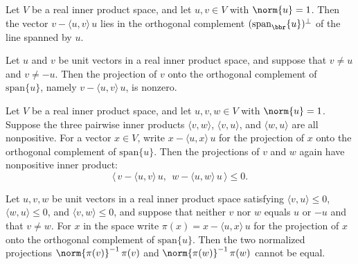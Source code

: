 \begin{lemma}
\label{CodingTheory.Johnson.orthProj_mem_orthogonal}
\leanok
{}
Let $V$ be a real inner product space, and let $u,v \in V$ with $\norm{u} = 1$. Then the
vector $v - \langle u,v\rangle\, u$ lies in the orthogonal complement
$(\mathrm{span}_{\bbr}\{u\})^{\perp}$ of the line spanned by $u$.
\end{lemma}

\begin{lemma}
\label{CodingTheory.Johnson.orthProj_ne_zero}
\leanok
{}
Let $u$ and $v$ be unit vectors in a real inner product space, and suppose that $v \neq
u$ and $v \neq -u$. Then the projection of $v$ onto the orthogonal complement of
$\mathrm{span}\{u\}$, namely $v - \langle u,v\rangle\, u$, is nonzero.
\end{lemma}

\begin{lemma}
\label{CodingTheory.Johnson.orthProj_inner_nonpos}
\leanok
{}
Let $V$ be a real inner product space, and let $u,v,w \in V$ with $\norm{u} = 1$.
Suppose the three pairwise inner products $\langle v,w\rangle$, $\langle v,u\rangle$,
and $\langle w,u\rangle$ are all nonpositive. For a vector $x \in V$, write $x - \langle
u,x\rangle\, u$ for the projection of $x$ onto the orthogonal complement of
$\mathrm{span}\{u\}$. Then the projections of $v$ and $w$ again have nonpositive inner
product:
\[
\bigl\langle\, v - \langle u,v\rangle\, u,\ \ w - \langle u,w\rangle\, u \,\bigr\rangle
\le 0.
\]
\end{lemma}

\begin{lemma}
\label{CodingTheory.Johnson.normalized_orthProj_injective}
\leanok
{}
Let $u,v,w$ be unit vectors in a real inner product space satisfying $\langle v,u\rangle
\le 0$, $\langle w,u\rangle \le 0$, and $\langle v,w\rangle \le 0$, and suppose that
neither $v$ nor $w$ equals $u$ or $-u$ and that $v \neq w$. For $x$ in the space write
$\pi(x) = x - \langle u,x\rangle\,u$ for the projection of $x$ onto the orthogonal
complement of $\mathrm{span}\{u\}$. Then the two normalized projections
$\norm{\pi(v)}^{-1}\,\pi(v)$ and $\norm{\pi(w)}^{-1}\,\pi(w)$ cannot be equal.
\end{lemma}

